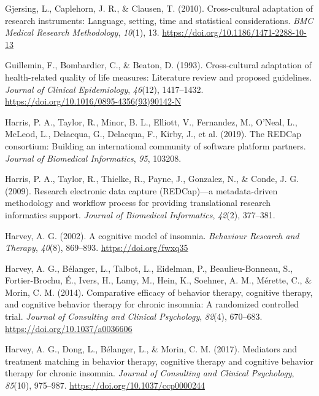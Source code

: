 \documentclass[
  ,doc,11pt, twoside,floatsintext]{apa6}
\newlength{\cslhangindent}
\newlength{\cslentryspacingunit} %
\newenvironment{CSLReferences}[2] %
 {%
  \setlength{\parindent}{0pt}
  \ifodd #1
  \let\oldpar\par
  \def\par{\hangindent=\cslhangindent\oldpar}
  \fi
  \setlength{\parskip}{#2\cslentryspacingunit}
 }%
 {}
\begin{document}
\begin{CSLReferences}{1}{0}
\leavevmode{}%
Gjersing, L., Caplehorn, J. R., \& Clausen, T. (2010). Cross-cultural adaptation of research instruments: Language, setting, time and statistical considerations. \emph{BMC Medical Research Methodology}, \emph{10}(1), 13. \url{https://doi.org/10.1186/1471-2288-10-13}

\leavevmode{}%
Guillemin, F., Bombardier, C., \& Beaton, D. (1993). Cross-cultural adaptation of health-related quality of life measures: {Literature} review and proposed guidelines. \emph{Journal of Clinical Epidemiology}, \emph{46}(12), 1417--1432. \url{https://doi.org/10.1016/0895-4356(93)90142-N}

\leavevmode{}%
Harris, P. A., Taylor, R., Minor, B. L., Elliott, V., Fernandez, M., O'Neal, L., McLeod, L., Delacqua, G., Delacqua, F., Kirby, J., et al. (2019). The REDCap consortium: Building an international community of software platform partners. \emph{Journal of Biomedical Informatics}, \emph{95}, 103208.

\leavevmode{}%
Harris, P. A., Taylor, R., Thielke, R., Payne, J., Gonzalez, N., \& Conde, J. G. (2009). Research electronic data capture (REDCap)---a metadata-driven methodology and workflow process for providing translational research informatics support. \emph{Journal of Biomedical Informatics}, \emph{42}(2), 377--381.

\leavevmode{}%
Harvey, A. G. (2002). A cognitive model of insomnia. \emph{Behaviour Research and Therapy}, \emph{40}(8), 869--893. \url{https://doi.org/fwxq35}

\leavevmode{}%
Harvey, A. G., Bélanger, L., Talbot, L., Eidelman, P., Beaulieu-Bonneau, S., Fortier-Brochu, É., Ivers, H., Lamy, M., Hein, K., Soehner, A. M., Mérette, C., \& Morin, C. M. (2014). Comparative efficacy of behavior therapy, cognitive therapy, and cognitive behavior therapy for chronic insomnia: A randomized controlled trial. \emph{Journal of Consulting and Clinical Psychology}, \emph{82}(4), 670--683. \url{https://doi.org/10.1037/a0036606}

\leavevmode{}%
Harvey, A. G., Dong, L., Bélanger, L., \& Morin, C. M. (2017). Mediators and treatment matching in behavior therapy, cognitive therapy and cognitive behavior therapy for chronic insomnia. \emph{Journal of Consulting and Clinical Psychology}, \emph{85}(10), 975--987. \url{https://doi.org/10.1037/ccp0000244}


\end{CSLReferences}
\end{document}
